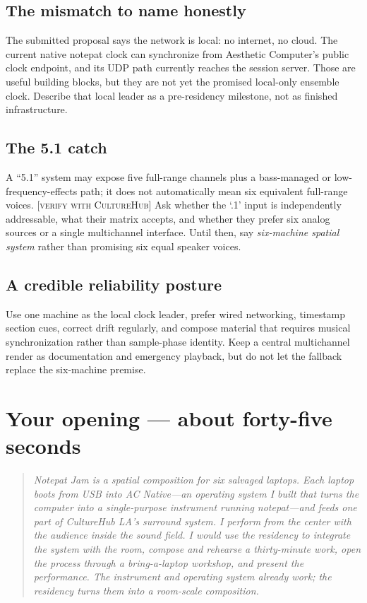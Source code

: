 \documentclass[11pt,letterpaper]{article}
\newcommand{\soft}[1]{{\color{acwarn}\footnotesize\textsc{[#1]}}}
\begin{document}
\subsection{The mismatch to name honestly}
The submitted proposal says the network is local: no internet, no cloud. The
current native notepat clock can synchronize from Aesthetic Computer's public
clock endpoint, and its UDP path currently reaches the session server. Those are
useful building blocks, but they are not yet the promised local-only ensemble
clock. Describe that local leader as a pre-residency milestone, not as finished
infrastructure.

\subsection{The 5.1 catch}
A ``5.1'' system may expose five full-range channels plus a bass-managed or
low-frequency-effects path; it does not automatically mean six equivalent
full-range voices. \soft{verify with CultureHub} Ask whether the `.1' input is
independently addressable, what their matrix accepts, and whether they prefer
six analog sources or a single multichannel interface. Until then, say
\emph{six-machine spatial system} rather than promising six equal speaker voices.

\subsection{A credible reliability posture}
Use one machine as the local clock leader, prefer wired networking, timestamp
section cues, correct drift regularly, and compose material that requires
musical synchronization rather than sample-phase identity. Keep a central
multichannel render as documentation and emergency playback, but do not let the
fallback replace the six-machine premise.

\section{Your opening — about forty-five seconds}

\begin{quote}
\color{acdark}
\textit{Notepat Jam is a spatial composition for six salvaged laptops. Each
laptop boots from USB into AC Native—an operating system I built that turns the
computer into a single-purpose instrument running notepat—and feeds one part of
CultureHub LA's surround system. I perform from the center with the audience
inside the sound field. I would use the residency to integrate the system with
the room, compose and rehearse a thirty-minute work, open the process through a
bring-a-laptop workshop, and present the performance. The instrument and
operating system already work; the residency turns them into a room-scale
composition.}
\end{quote}
\end{document}
